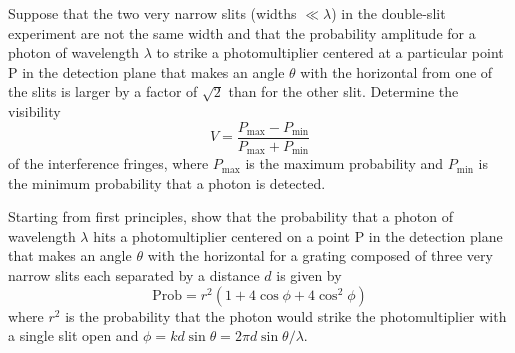 \documentclass[12pt,letterpaper,boxed,cm]{hmcpset}
\newcommand{\s}[1]{\sqrt{#1}}
\newcommand{\f}[2]{\frac{#1}{#2}}
\newcommand{\pn}[1]{\left( #1 \right)}
\begin{document}
\begin{problem}[Townsend 1.29]
Suppose that the two very narrow slits (widths $\ll \lambda$) in the double-slit experiment are not the same width and that the probability amplitude for a photon of wavelength $\lambda$ to strike a photomultiplier centered at a particular point P in the detection plane that makes an angle $\theta$ with the horizontal from one of the slits is larger by a factor of $\s{2}$ than for the other slit. Determine the visibility
	\[
		V = \f{P_\text{max} - P_\text{min}}{P_\text{max} + P_\text{min}}
	\]
	of the interference fringes, where $P_\text{max}$ is the maximum probability and $P_\text{min}$ is the minimum probability that a photon is detected.
\end{problem}

\begin{solution}
\end{solution}
\newpage

\begin{problem}[Townsend 1.34]
Starting from first principles, show that the probability that a photon of wavelength $\lambda$ hits a photomultiplier centered on a point P in the detection plane that makes an angle $\theta$ with the horizontal for a grating composed of three very narrow slits each separated by a distance $d$ is given by
\[
	\text{Prob} = r^2\pn{1 +4\cos\phi + 4\cos^2\phi}
\]
where $r^2$ is the probability that the photon would strike the photomultiplier with a single slit open and $\phi = kd\sin\theta = 2\pi d\sin\theta/\lambda$.
\end{problem}
\begin{solution}
\end{solution}
\end{document}
